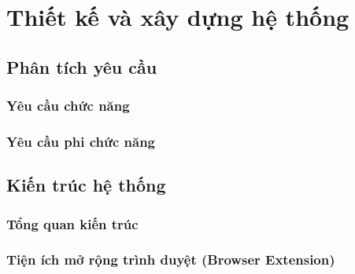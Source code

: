 \chapter{Thiết kế và xây dựng hệ thống}

\section{Phân tích yêu cầu}

\subsection{Yêu cầu chức năng}

\subsection{Yêu cầu phi chức năng}

\section{Kiến trúc hệ thống}

\subsection{Tổng quan kiến trúc}

\subsection{Tiện ích mở rộng trình duyệt (Browser Extension)}

